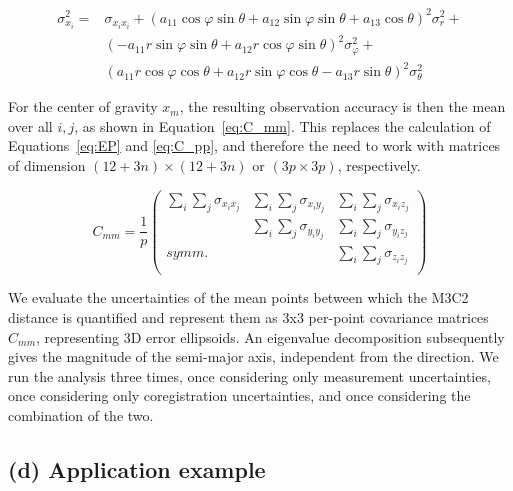 \documentclass[preprint,12pt,3p]{elsarticle}
\begin{document}
\begin{equation}
\begin{array}{rl}
    \sigma_{x_i}^2 = & \sigma_{x_i  x_i} + \left( a_{11} \cos \varphi \sin \theta + a_{12} \sin \varphi \sin \theta + a_{13} \cos \theta \right)^2 \sigma_{r}^2 +\\
    & \left( - a_{11} r \sin \varphi \sin \theta + a_{12} r \cos \varphi \sin \theta \right) ^2 \sigma_{\varphi}^2 + \\
    & \left( a_{11} r \cos \varphi \cos \theta + a_{12} r \sin \varphi \cos \theta - a_{13} r \sin \theta \right)^2 \sigma_{\theta}^2
\end{array}
\label{eq:sigma_xi2}
\end{equation}

For the center of gravity $x_m$, the resulting observation accuracy is then the mean over all $i,j$, as shown in Equation~\ref{eq:C_mm}. This replaces the calculation of Equations~\ref{eq:EP} and \ref{eq:C_pp}, and therefore the need to work with matrices of dimension $(12+3n)\times (12+3n)$ or $(3p\times 3p)$, respectively.


\begin{equation}
C_{mm} =  \frac{1}{p}
   \begin{pmatrix}
    \sum_i \sum_j \sigma_{x_i x_j} & \sum_i \sum_j \sigma_{x_i y_j} & \sum_i \sum_j \sigma_{x_i z_j} \\
    
      & \sum_i \sum_j \sigma_{y_i y_j} & \sum_i \sum_j \sigma_{y_i z_j} \\
    
    symm. &  & \sum_i \sum_j \sigma_{z_i z_j} \\
    
    \end{pmatrix}
    \label{eq:C_mm}
\end{equation}

We evaluate the uncertainties of the mean points between which the M3C2 distance is quantified and represent them as 3x3 per-point covariance matrices $C_{mm}$, representing 3D error ellipsoids. An eigenvalue decomposition subsequently gives the magnitude of the semi-major axis, independent from the direction. We run the analysis three times, once considering only measurement uncertainties, once considering only coregistration uncertainties, and once considering the combination of the two.

\subsection{(d) Application example}
\label{sec:methods-d}
\end{document}

